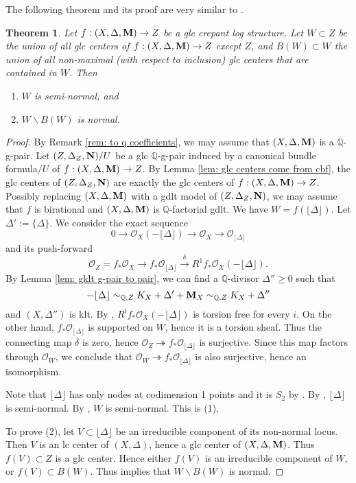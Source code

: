 \documentclass[11pt]{amsart}
\numberwithin{equation}{section}
\newcommand{\Mm}{{\bf{M}}}
\newcommand{\NN}{{\bf{N}}}
\newcommand{\Qq}{\mathbb{Q}}
\newcommand{\lf}{\lfloor}
\newcommand{\rf}{\rfloor}
\newcommand{\Oo}{\mathcal{O}}
\newtheorem{thm}{Theorem}[section]
\theoremstyle{definition}
\theoremstyle{definition}
\theoremstyle{definition}
\begin{document}
The following theorem and its proof are very similar to \cite[Theorem
4.32]{Kol13}.
\begin{thm}\label{thm: glc locus is semi-normal}
  Let $f:(X,\Delta,\Mm)\to Z$ be a glc crepant log structure. Let
  $W\subset Z$ be the union of all glc centers of
  $f:(X,\Delta,\Mm)\to Z$ except $Z$, and $B(W)\subset W$ the union
  of all non-maximal (with respect to inclusion) glc centers that are
  contained in $W$. Then
  \begin{enumerate}
    \item $W$ is semi-normal, and
    \item $W\backslash B(W)$ is normal.
  \end{enumerate}
\end{thm}
\begin{proof}
  By Remark \ref{rem: to q coefficients}, we may assume that
  $(X,\Delta,\Mm)$ is a $\Qq$-g-pair. Let $(Z,\Delta_Z,\NN)/U$ be a
  glc $\mathbb Q$-g-pair induced by a canonical bundle formula$/U$ of
  $f: (X,\Delta,\Mm)\rightarrow Z$. By Lemma \ref{lem: glc centers
  come from cbf}, the glc centers of $(Z,\Delta_Z,\NN)$ are exactly
  the glc centers of $f: (X,\Delta,\Mm)\rightarrow Z$. Possibly
  replacing $(X,\Delta,\Mm)$ with a gdlt model of $(Z,\Delta_Z,\NN)$,
  we may assume that $f$ is birational and $(X,\Delta,\Mm)$ is
  $\mathbb Q$-factorial gdlt. We have $W=f(\lf\Delta\rf)$. Let
  $\Delta':=\{\Delta\}$. We consider the exact sequence
  $$
  0\to\Oo_X(-\lf\Delta\rf)\to\Oo_X\to\Oo_{\lf\Delta\rf}
  $$
  and its push-forward
  $$
  \Oo_Z=f_*\Oo_X\to
  f_*\Oo_{\lf\Delta\rf}\stackrel{\delta}{\longrightarrow}R^1f_*\Oo_X(-\lf\Delta\rf).
  $$
  By Lemma \ref{lem: gklt g-pair to pair}, we can find a
  $\Qq$-divisor $\Delta''\ge 0$ such that
  $$-\lf\Delta\rf\sim_{\Qq,Z}K_X+\Delta'+\Mm_X\sim_{\Qq,Z}K_X+\Delta''$$
  and $(X,\Delta'')$ is klt. By \cite[Corollary 10.40]{Kol13},
  $R^if_*\Oo_{X}(-\lf\Delta\rf)$ is torsion free for every $i$. On
  the other hand, $f_*\Oo_{\lf\Delta\rf}$ is supported on $W$, hence
  it is a torsion sheaf. Thus the connecting map $\delta$ is zero,
  hence $\Oo_Z\twoheadrightarrow f_*\Oo_{\lf\Delta\rf}$ is
  surjective. Since this map factors through $\Oo_W$, we conclude
  that $\Oo_W\twoheadrightarrow f_*\Oo_{\lf\Delta\rf}$ is also
  surjective, hence an isomorphism.

  Note that $\lf\Delta\rf$ has only nodes at codimension 1 points and
  it is $S_2$ by \cite[Corollary 2.88]{Kol13}. By \cite[Lemma
  10.14]{Kol13}, $\lf\Delta\rf$ is semi-normal. By \cite[Lemma
  10.15]{Kol13}, $W$ is semi-normal. This is (1).

  To prove (2), let $V\subset\lf\Delta\rf$ be an irreducible
  component of its non-normal locus. Then $V$ is an lc center of $(X,
  \Delta)$, hence a glc center of $(X,\Delta,\Mm)$. Thus $f(V)\subset
  Z$ is a glc center. Hence either $f(V)$ is an irreducible component
  of $W$, or $f(V)\subset B(W)$. Thus \cite[Complement
  10.15.1]{Kol13} implies that $W \backslash B(W)$ is normal.
\end{proof}
\end{document}
